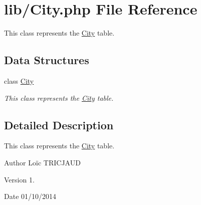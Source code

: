 \hypertarget{_city_8php}{\section{lib/\-City.php File Reference}
\label{_city_8php}
}


This class represents the \hyperlink{class_city}{City} table.  


\subsection*{Data Structures}
\begin{DoxyCompactItemize}
\item 
class \hyperlink{class_city}{City}
\begin{DoxyCompactList}\small\item\em This class represents the \hyperlink{class_city}{City} table. \end{DoxyCompactList}\end{DoxyCompactItemize}


\subsection{Detailed Description}
This class represents the \hyperlink{class_city}{City} table. \begin{DoxyAuthor}{Author}
Loïc T\-R\-I\-C\-J\-A\-U\-D 
\end{DoxyAuthor}
\begin{DoxyVersion}{Version}
1. 
\end{DoxyVersion}
\begin{DoxyDate}{Date}
01/10/2014 
\end{DoxyDate}
